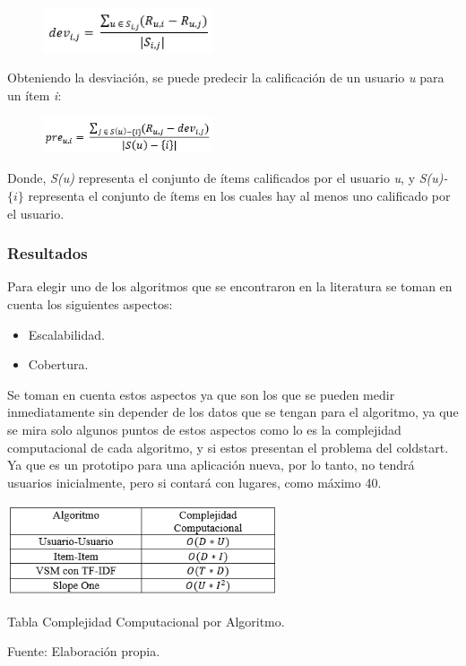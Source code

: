\documentclass[12pt,letterpaper,openany]{book}
\begin{document}
\begin{figure}[H]
\begin{center}
\includegraphics[width=5cm]{./imagenes/formulas/form9}
\end{center}
\end{figure}

Obteniendo la desviación, se puede predecir la calificación de un usuario \textit{u} para un ítem \textit{i}:

\begin{figure}[H]
\begin{center}
\includegraphics[width=5cm]{./imagenes/formulas/form10}
\end{center}
\end{figure}

Donde, \textit{S(u)} representa el conjunto de ítems calificados por el usuario \textit{u}, y \textit{S(u)-$\lbrace{i}\rbrace$} representa el conjunto de ítems en los cuales hay al menos uno calificado por el usuario.

\subsubsection{Resultados}
Para elegir uno de los algoritmos que se encontraron en la literatura se toman en cuenta los siguientes aspectos:

\begin{itemize}
    \item Escalabilidad.
    \item Cobertura.
\end{itemize}

Se toman en cuenta estos aspectos ya que son los que se pueden medir inmediatamente sin depender de los datos que se tengan para el algoritmo, ya que se mira solo algunos puntos de estos aspectos como lo es la complejidad computacional de cada algoritmo, y si estos presentan el problema del coldstart. Ya que es un prototipo para una aplicación nueva, por lo tanto, no tendrá usuarios inicialmente, pero si contará con lugares, como máximo 40.	

\begin{table}[H]
\centering
\includegraphics[width=8cm]{./imagenes/formulas/tablaAlgoritmos}
\caption{Tabla Complejidad Computacional por Algoritmo.}
\centering Fuente: Elaboración propia.
\end{table}
\end{document}
